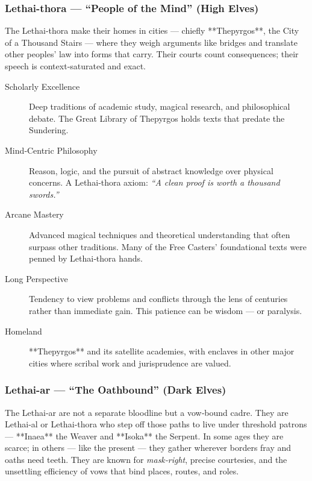 \subsubsection*{Lethai-thora — “People of the Mind” (High Elves)}
\label{subsubsec:lethai-thora}

The Lethai‑thora make their homes in cities — chiefly **Thepyrgos**, the City of a Thousand Stairs — where they weigh arguments like bridges and translate other peoples’ law into forms that carry. Their courts count consequences; their speech is context‑saturated and exact.

\begin{description}
\item[Scholarly Excellence] Deep traditions of academic study, magical research, and philosophical debate. The Great Library of Thepyrgos holds texts that predate the Sundering.
\item[Mind‑Centric Philosophy] Reason, logic, and the pursuit of abstract knowledge over physical concerns. A Lethai‑thora axiom: \emph{“A clean proof is worth a thousand swords.”}
\item[Arcane Mastery] Advanced magical techniques and theoretical understanding that often surpass other traditions. Many of the Free Casters’ foundational texts were penned by Lethai‑thora hands.
\item[Long Perspective] Tendency to view problems and conflicts through the lens of centuries rather than immediate gain. This patience can be wisdom — or paralysis.
\item[Homeland] **Thepyrgos** and its satellite academies, with enclaves in other major cities where scribal work and jurisprudence are valued.
\end{description}

\subsubsection*{Lethai-ar — “The Oathbound” (Dark Elves)}
\label{subsubsec:lethai-ar}

The Lethai‑ar are not a separate bloodline but a vow‑bound cadre. They are Lethai‑al or Lethai‑thora who step off those paths to live under threshold patrons — **Inaea** the Weaver and **Isoka** the Serpent. In some ages they are scarce; in others — like the present — they gather wherever borders fray and oaths need teeth. They are known for \emph{mask‑right}, precise courtesies, and the unsettling efficiency of vows that bind places, routes, and roles.

